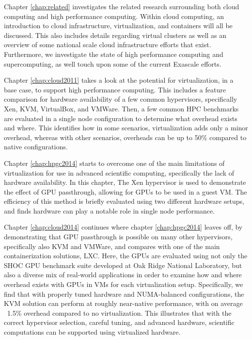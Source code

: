 Chapter \ref{chap:related} investigates the related research surrounding both cloud computing and high performance computing. Within cloud computing, an introduction to cloud infrastructure, virtualization, and containers will all be discussed. This also includes details regarding virtual clusters as well as an overview of some national scale cloud infrastructure efforts that exist. Furthermore, we investigate the state of high performance computing and supercomputing, as well touch upon some of the current Exascale efforts.

Chapter \ref{chap:cloud2011} takes a look at the potential for virtualization, in a base case, to support high performance computing. This includes a feature comparison for hardware availability of a few common hypervisors, specifically Xen, KVM, VirtualBox, and VMWare. Then, a few common HPC benchmarks are evaluated in a single node configuration to determine what overhead exists and where. This identifies how in some scenarios, virtualization adds only a minor overhead, whereas with other scenarios, overheads can be up to 50\% compared to native configurations. 

Chapter \ref{chap:hpgc2014} starts to overcome one of the main limitations of virtualization for use in advanced scientific computing, specifically the lack of hardware availability. In this chapter, The Xen hypervisor is used to demonstrate the effect of GPU passthrough, allowing for GPUs to be used in a guest VM. The efficiency of this method is briefly evaluated using two different hardware setups, and finds hardware can play a notable role in single node performance. 

Chapter \ref{chap:cloud2014} continues where chapter \ref{chap:hpgc2014} leaves off, by demonstrating that GPU passthrough is possible on many other hypervisors, specifically also KVM and VMWare, and compares with one of the main containerization solutions, LXC. Here, the GPUs are evaluated using not only the SHOC GPU benchmark suite developed at Oak Ridge National Laboratory, but also a diverse mix of real-world applications in order to examine how and where overhead exists with GPUs in VMs for each virtualization setup.  Specifically, we find that with properly tuned hardware and NUMA-balanced configurations, the KVM solution can perform at roughly near-native performance, with on average ~1.5\% overhead compared to no virtualization. This illustrates that with the correct hypervisor selection, careful tuning, and advanced hardware, scientific computations can be supported using virtualized hardware. 

